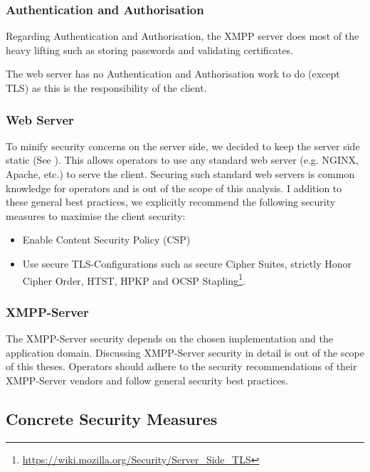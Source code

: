 \subsubsection{Authentication and Authorisation}

Regarding Authentication and Authorisation, the XMPP server does most of the heavy lifting such as storing passwords and validating certificates.

The web server has no Authentication and Authorisation work to do (except TLS) as this is the responsibility of the client.

\subsubsection{Web Server}

To minify security concerns on the server side, we decided to keep the server side static (See ).
This allows operators to use any standard web server (e.g. NGINX, Apache, etc.) to serve the client.
Securing such standard web servers is common knowledge for operators and is out of the scope of this analysis.
I addition to these general best practices, we explicitly recommend the following security measures to maximise the client security:

\begin{itemize}
    \item Enable Content Security Policy (CSP) \cite{w3c-csp}
    \item Use secure TLS-Configurations such as secure Cipher Suites, strictly Honor Cipher Order, HTST, HPKP and OCSP Stapling\footnote{\url{https://wiki.mozilla.org/Security/Server_Side_TLS}}.
\end{itemize}


\subsubsection{XMPP-Server}

The XMPP-Server security depends on the chosen implementation and the application domain.
Discussing XMPP-Server security in detail is out of the scope of this theses.
Operators should adhere to the security recommendations of their XMPP-Server vendors and follow general security best practices.

\subsection{Concrete Security Measures}

